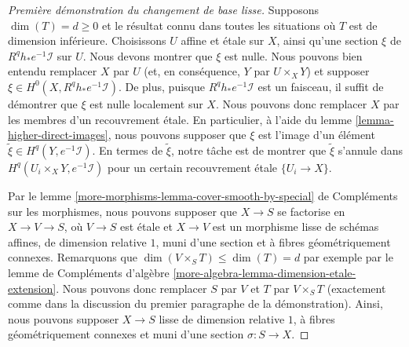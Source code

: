 \begin{proof}[Première démonstration du changement de base lisse]
\medskip\noindent
Supposons $\dim(T) = d \geq 0$ et le résultat connu dans toutes les situations où $T$
est de dimension inférieure. Choisissons $U$ affine et étale sur $X$, ainsi qu'une section $\xi$
de $R^qh_*e^{-1}\mathcal{I}$ sur $U$. Nous devons montrer
que $\xi$ est nulle. Nous pouvons bien entendu remplacer $X$ par $U$
(et, en conséquence, $Y$ par $U \times_X Y$)
et supposer $\xi \in H^0(X, R^qh_*e^{-1}\mathcal{I})$.
De plus, puisque $R^qh_*e^{-1}\mathcal{I}$ est un faisceau,
il suffit de démontrer que $\xi$ est nulle localement sur $X$.
Nous pouvons donc remplacer $X$ par les membres d'un recouvrement étale.
En particulier, à l'aide du lemme \ref{lemma-higher-direct-images},
nous pouvons supposer que $\xi$ est l'image d'un élément
$\tilde \xi \in H^q(Y, e^{-1}\mathcal{I})$.
En termes de $\tilde \xi$, notre tâche est de montrer que
$\tilde \xi$ s'annule dans $H^q(U_i \times_X Y, e^{-1}\mathcal{I})$
pour un certain recouvrement étale $\{U_i \to X\}$.

\medskip\noindent
Par le lemme \ref{more-morphisms-lemma-cover-smooth-by-special} de Compléments sur les morphismes,
nous pouvons supposer que $X \to S$ se factorise en $X \to V \to S$,
où $V \to S$ est étale et $X \to V$ est un morphisme lisse
de schémas affines, de dimension relative $1$, muni d'une section et
à fibres géométriquement connexes. Remarquons que
$\dim(V \times_S T) \leq \dim(T) = d$
par exemple par le lemme de Compléments d'algèbre
\ref{more-algebra-lemma-dimension-etale-extension}.
Nous pouvons donc remplacer $S$ par $V$ et $T$ par $V \times_S T$
(exactement comme dans la discussion du premier paragraphe de la démonstration).
Ainsi, nous pouvons supposer $X \to S$ lisse de dimension relative $1$,
à fibres géométriquement connexes et muni d'une section $\sigma : S \to X$.


\end{proof}
